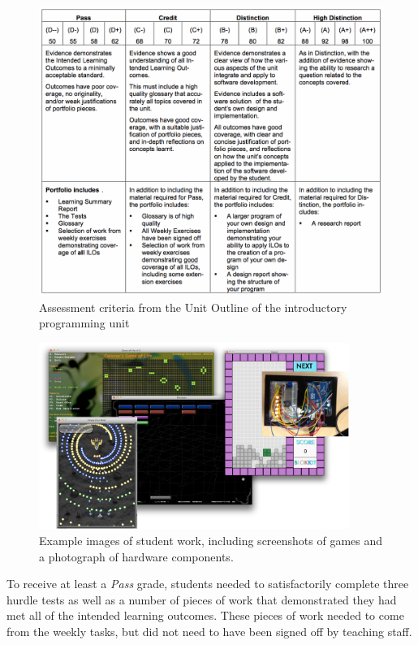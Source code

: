\begin{figure}[p]
	\centering
	\includegraphics[width=\textwidth]{AssessmentCriteria}
	\caption{Assessment criteria from the Unit Outline of the introductory programming unit}
	\label{fig:assessment_criteria}
\end{figure}

\begin{figure}[p]
	\centering
	\includegraphics[width=0.9\textwidth]{StudentGames}
	\caption{Example images of student work, including screenshots of games and a photograph of hardware components.  }
	\label{fig:student_games}
\end{figure}

To receive at least a \emph{Pass} grade, students needed to satisfactorily complete three hurdle tests as well as a number of pieces of work that demonstrated they had met all of the intended learning outcomes. These pieces of work needed to come from the weekly tasks, but did not need to have been signed off by teaching staff. 

